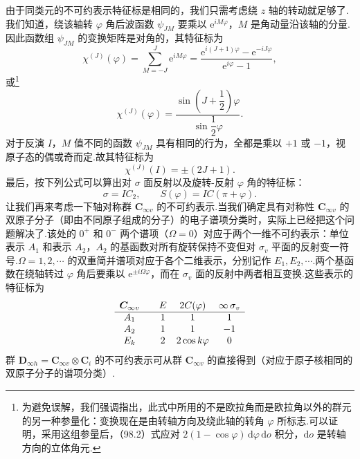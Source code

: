 由于同类元的不可约表示特征标是相同的，我们只需考虑绕 $z$ 轴的转动就足够了.我们知道，绕该轴转 $\varphi$ 角后波函数 $\psi_{JM}$ 要乘以 $\mathrm{e}^{iM\varphi}$，$M$ 是角动量沿该轴的分量.因此函数组 $\psi_{JM}$ 的变换矩阵是对角的，其特征标为
\begin{equation*}
  \chi^{(J)}(\varphi)=\sum_{M=-J}^{J}\mathrm{e}^{iM\varphi}
  =\frac{\mathrm{e}^{i(J+1)\varphi}-\mathrm{e}^{-iJ\varphi}}{\mathrm{e}^{i\varphi}-1},
\end{equation*}
或\footnote{为避免误解，我们强调指出，此式中所用的不是欧拉角而是欧拉角以外的群元的另一种参量化：变换现在是由转轴方向及绕此轴的转角 $\varphi$ 所标志.可以证明，采用这组参量后，（98.2）式应对 $2(1-\cos\varphi)\,\mathrm{d}\varphi\,\mathrm{d}o$ 积分，$\mathrm{d}o$ 是转轴方向的立体角元.}
\begin{equation}
  \chi^{(J)}(\varphi)=
  \frac{\sin\left(J+\dfrac{1}{2}\right)\varphi}{\sin\dfrac{1}{2}\varphi}.
\end{equation}
对于反演 $I$，$M$ 值不同的函数 $\psi_{JM}$ 具有相同的行为，全都是乘以 $+1$ 或 $-1$，视原子态的偶或奇而定.故其特征标为
\begin{equation}
  \chi^{(J)}(I)=\pm(2J+1).
\end{equation}
最后，按下列公式可以算出对 $\sigma$ 面反射以及旋转-反射 $\varphi$ 角的特征标：
\begin{equation*}
  \sigma=IC_2,\qquad S(\varphi)=IC(\pi+\varphi).
\end{equation*}
让我们再来考虑一下轴对称群 $\boldsymbol{C}_{\infty v}$ 的不可约表示.当我们确定具有对称性 $\boldsymbol{C}_{\infty v}$ 的双原子分子（即由不同原子组成的分子）的电子谱项分类时，实际上已经把这个问题解决了.该处的 $0^+$ 和 $0^-$ 两个谱项（$\Omega=0$）对应于两个一维不可约表示：单位表示 $A_1$ 和表示 $A_2$，$A_2$ 的基函数对所有旋转保持不变但对 $\sigma_v$ 平面的反射变一符号.$\Omega=1,2,\cdots$ 的双重简并谱项对应于各个二维表示，分别记作 $E_1,E_2,\cdots$.两个基函数在绕轴转过 $\varphi$ 角后要乘以 $\mathrm{e}^{\pm i\Omega\varphi}$，而在 $\sigma_v$ 面的反射中两者相互变换.这些表示的特征标为
\begin{equation}
\begin{array}{c@{\qquad}ccc}
  \boldsymbol{C}_{\infty v} & E & 2C(\varphi) & \infty\,\sigma_v\\
  \hline
  A_1 & 1 & 1 & 1\\
  A_2 & 1 & 1 & -1\\
  E_k & 2 & 2\cos k\varphi & 0
\end{array}
\end{equation}
群 $\boldsymbol{D}_{\infty h}=\boldsymbol{C}_{\infty v}\otimes\boldsymbol{C}_i$ 的不可约表示可从群 $\boldsymbol{C}_{\infty v}$ 的直接得到（对应于原子核相同的双原子分子的谱项分类）.

